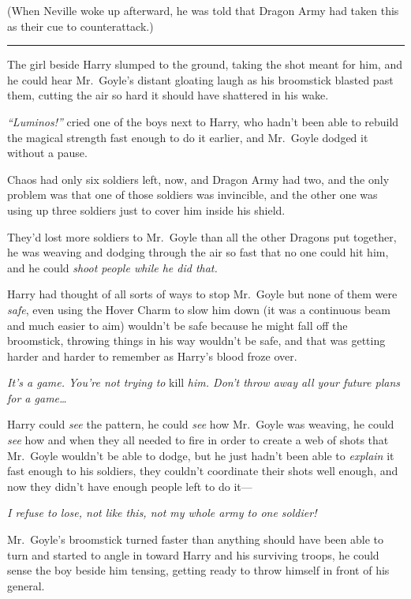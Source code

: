 (When Neville woke up afterward, he was told that Dragon Army had taken
this as their cue to counterattack.)

\begin{center}\rule{3in}{0.4pt}\end{center}

The girl beside Harry slumped to the ground, taking the shot meant for
him, and he could hear Mr.~Goyle's distant gloating laugh as his
broomstick blasted past them, cutting the air so hard it should have
shattered in his wake.

\emph{``Luminos!''} cried one of the boys next to Harry, who hadn't been
able to rebuild the magical strength fast enough to do it earlier, and
Mr.~Goyle dodged it without a pause.

Chaos had only six soldiers left, now, and Dragon Army had two, and the
only problem was that one of those soldiers was invincible, and the
other one was using up three soldiers just to cover him inside his
shield.

They'd lost more soldiers to Mr.~Goyle than all the other Dragons put
together, he was weaving and dodging through the air so fast that no one
could hit him, and he could \emph{shoot people while he did that.}

Harry had thought of all sorts of ways to stop Mr.~Goyle but none of
them were \emph{safe}, even using the Hover Charm to slow him down (it
was a continuous beam and much easier to aim) wouldn't be safe because
he might fall off the broomstick, throwing things in his way wouldn't be
safe, and that was getting harder and harder to remember as Harry's
blood froze over.

\emph{It's a game. You're not trying to} kill \emph{him. Don't throw
away all your future plans for a game\ldots{}}

Harry could \emph{see} the pattern, he could \emph{see} how Mr.~Goyle
was weaving, he could \emph{see} how and when they all needed to fire in
order to create a web of shots that Mr.~Goyle wouldn't be able to dodge,
but he just hadn't been able to \emph{explain} it fast enough to his
soldiers, they couldn't coordinate their shots well enough, and now they
didn't have enough people left to do it---

\emph{I refuse to lose, not like this, not my whole army to one
soldier!}

Mr.~Goyle's broomstick turned faster than anything should have been able
to turn and started to angle in toward Harry and his surviving troops,
he could sense the boy beside him tensing, getting ready to throw
himself in front of his general.

